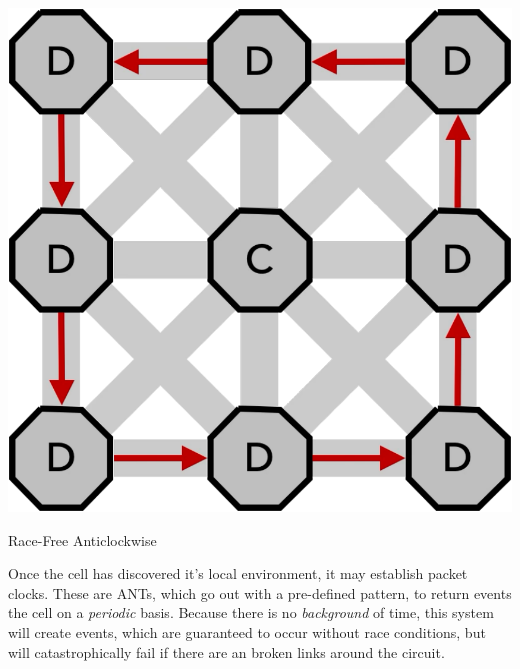  \begin{marginfigure}
        \includegraphics[width=\linewidth,trim=0mm 0mm 0mm 0mm, clip]{../../FIGURES/3x3-anticlockwise.pdf} %
  \caption{Race-Free Anticlockwise }
    \vspace{10pt}
\end{marginfigure}

Once the cell has discovered it's local environment, it may establish packet clocks. These are ANTs, which go out with a pre-defined pattern, to return events the cell on a \emph{periodic} basis.  Because there is no \emph{background} of time, this system will create events, which are guaranteed to occur without race conditions, but will catastrophically fail if there are an broken links around the circuit.


